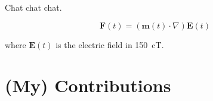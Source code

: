 \documentclass[../main.tex]{subfiles}
\begin{document}
Chat chat chat.

\begin{equation} \label{bla}
\textbf{F}(t) = (\textbf{m}(t)\cdot\nabla)\textbf{E}(t)
\end{equation}

where $\textbf{E}(t)$ is the electric field in \SI{150}{\centi \tesla}.


\section{(My) Contributions}
\end{document}
